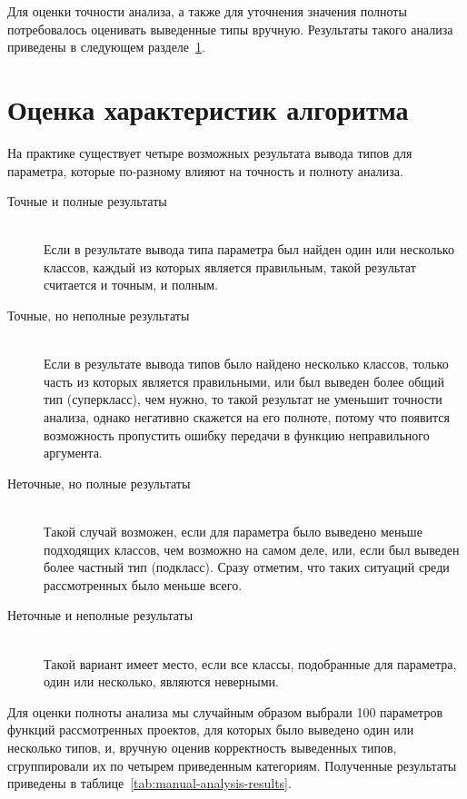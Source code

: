 Для оценки точности анализа, а также для уточнения значения полноты
потребовалось оценивать выведенные типы вручную. Результаты такого анализа приведены в
следующем разделе~\ref{sec:precise-analysis}.

\section{Оценка характеристик алгоритма}
\label{sec:precise-analysis}

На практике существует четыре возможных результата вывода типов для параметра,
которые по-разному влияют на точность и полноту анализа.

\begin{description}

  \item[Точные и полные результаты] \hfill \\
    Если в результате вывода типа параметра был найден один или несколько
    классов, каждый из которых является правильным, такой результат считается и
    точным, и полным.
    
  \item[Точные, но неполные результаты] \hfill \\
    Если в результате вывода типов было найдено несколько классов, только часть
    из которых является правильными, или был выведен более общий тип
    (суперкласс), чем нужно, то такой результат не уменьшит точности анализа,
    однако негативно скажется на его полноте, потому что появится возможность
    пропустить ошибку передачи в функцию неправильного аргумента.

  \item[Неточные, но полные результаты] \hfill \\
    Такой случай возможен, если для параметра было выведено меньше подходящих
    классов, чем возможно на самом деле, или, если был выведен более частный тип
    (подкласс). Сразу отметим, что таких ситуаций среди рассмотренных было
    меньше всего.

  \item[Неточные и неполные результаты] \hfill \\
    Такой вариант имеет место, если все классы, подобранные для параметра, один
    или несколько, являются неверными.

\end{description}

Для оценки полноты анализа мы случайным образом выбрали 100 параметров функций
рассмотренных проектов, для которых было выведено один или несколько типов, и,
вручную оценив корректность выведенных типов, сгруппировали их по четырем
приведенным категориям. Полученные результаты приведены в
таблице~\ref{tab:manual-analysis-results}.

